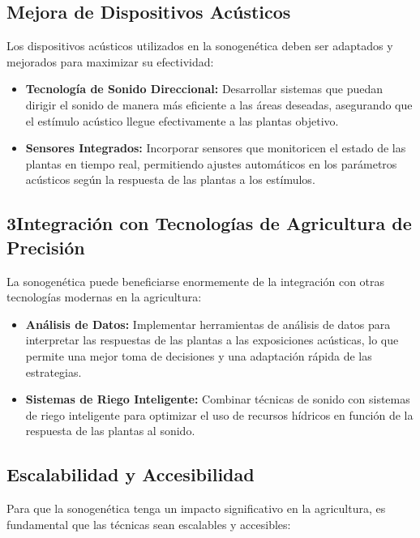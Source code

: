 \documentclass[twocolumn]{article}
\begin{document}
\subsection{Mejora de Dispositivos Acústicos}

Los dispositivos acústicos utilizados en la sonogenética deben ser adaptados y mejorados para maximizar su efectividad:

\begin{itemize}
    \item \textbf{Tecnología de Sonido Direccional:} Desarrollar sistemas que puedan dirigir el sonido de manera más eficiente a las áreas deseadas, asegurando que el estímulo acústico llegue efectivamente a las plantas objetivo.

    \item \textbf{Sensores Integrados:} Incorporar sensores que monitoricen el estado de las plantas en tiempo real, permitiendo ajustes automáticos en los parámetros acústicos según la respuesta de las plantas a los estímulos.
\end{itemize}

\subsection{3Integración con Tecnologías de Agricultura de Precisión}

La sonogenética puede beneficiarse enormemente de la integración con otras tecnologías modernas en la agricultura:

\begin{itemize}
    \item \textbf{Análisis de Datos:} Implementar herramientas de análisis de datos para interpretar las respuestas de las plantas a las exposiciones acústicas, lo que permite una mejor toma de decisiones y una adaptación rápida de las estrategias.

    \item \textbf{Sistemas de Riego Inteligente:} Combinar técnicas de sonido con sistemas de riego inteligente para optimizar el uso de recursos hídricos en función de la respuesta de las plantas al sonido.
\end{itemize}

\subsection{Escalabilidad y Accesibilidad}

Para que la sonogenética tenga un impacto significativo en la agricultura, es fundamental que las técnicas sean escalables y accesibles:
\end{document}
